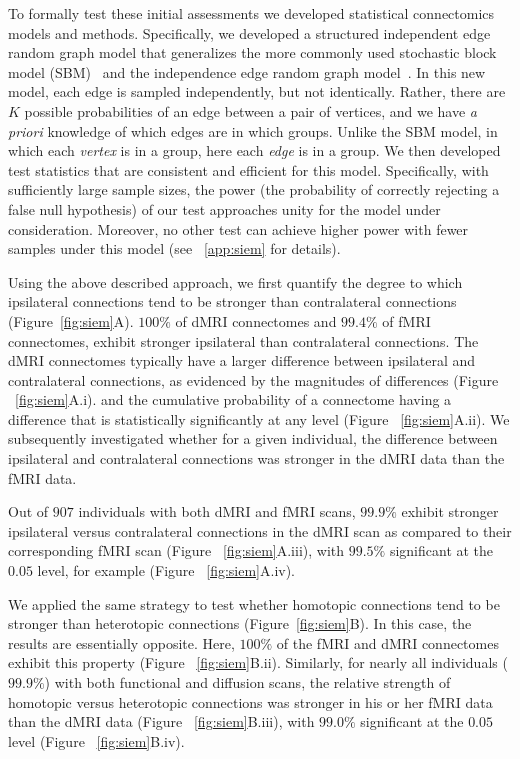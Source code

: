 \documentclass[11pt]{article}
\begin{document}
\begin{multicols}{2}
To formally test these initial assessments we developed statistical connectomics models and methods. Specifically, we developed a structured independent edge random graph model that generalizes the more commonly used  stochastic block model (SBM)~\cite{Holland83} and the independence edge random graph model~\cite{Bollobas2009}. In this new model, each edge is sampled independently, but not identically. Rather, there are $K$ possible probabilities of an edge between a pair of vertices, and we have \emph{a priori} knowledge of which edges are in which groups.  Unlike the SBM 
 model, in which each \emph{vertex} is in a group, here each \emph{edge} is in a group.  We then developed test statistics that are consistent and efficient for this model. Specifically, with sufficiently large sample sizes, the power (the probability of correctly rejecting a false null hypothesis) of our test approaches unity for the model under consideration.  Moreover, no other test can achieve higher power with fewer samples under this model (see ~\ref{app:siem} for details).

Using the above described approach, we first quantify the degree to which ipsilateral connections tend to be stronger than contralateral connections (Figure~\ref{fig:siem}A).   
$100\%$ of dMRI connectomes and $99.4\%$ of fMRI connectomes, exhibit stronger ipsilateral than contralateral connections.
The dMRI connectomes typically have a larger difference between ipsilateral and contralateral connections, as evidenced by the magnitudes of differences (Figure ~\ref{fig:siem}A.i). and the cumulative probability of a connectome having a difference that is statistically significantly at any level (Figure ~\ref{fig:siem}A.ii).
We subsequently investigated whether for a given individual, the difference between ipsilateral and contralateral connections was stronger in the dMRI data than the fMRI data. 

Out of $907$ individuals with both dMRI and fMRI scans, $99.9\%$ exhibit  stronger ipsilateral versus contralateral connections in the dMRI scan as compared to their corresponding fMRI scan (Figure ~\ref{fig:siem}A.iii), with $99.5\%$ significant at the $0.05$ level, for example (Figure ~\ref{fig:siem}A.iv).

We applied the same strategy to test whether homotopic connections tend to be stronger than heterotopic connections (Figure~\ref{fig:siem}B). In this case, the results are essentially opposite. Here, $100\%$ of the fMRI and dMRI connectomes exhibit this property (Figure ~\ref{fig:siem}B.ii). Similarly, for nearly all individuals ($99.9\%$) with both functional and diffusion scans, the relative strength of homotopic versus heterotopic connections was stronger in his or her fMRI data than the dMRI data (Figure ~\ref{fig:siem}B.iii), with $99.0\%$ significant at the $0.05$ level (Figure ~\ref{fig:siem}B.iv).  



\end{multicols}
\end{document}
